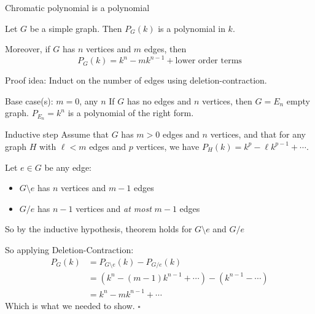 \documentclass{beamer}
\begin{document}
\begin{frame}{Chromatic polynomial is a polynomial}
\begin{theorem}
Let $G$ be a simple graph. Then $P_G(k)$ is a polynomial in $k$.  

Moreover, if $G$ has $n$ vertices and $m$ edges, then 
$$P_G(k)=k^n-mk^{n-1}+\text{lower order terms}$$
\end{theorem}

\begin{block}{Proof idea:}
Induct on the number of edges using deletion-contraction.
\end{block}
\begin{block}{Base case(s): $m=0$, any $n$}
If $G$ has no edges and $n$ vertices, then $G=E_n$ empty graph.
$P_{E_n}=k^n$ is a polynomial of the right form.
\end{block}

\end{frame}
\begin{frame}{Inductive step}
Assume that $G$ has $m>0$ edges and $n$ vertices, and that for any graph $H$ with $\ell<m$ edges and $p$ vertices, we have $P_H(k)=k^p-\ell k^{p-1}+\cdots$.

\begin{block}{Let $e\in G$ be any edge:}
\begin{itemize}
    \item $G\setminus e$ has $n$ vertices and $m-1$ edges
    \item $G/e$ has $n-1$ vertices and \emph{at most} $m-1$ edges
\end{itemize}
So by the inductive hypothesis, theorem holds for $G\setminus e$ and $G/e$
\end{block}
\begin{block}{So applying Deletion-Contraction:}\begin{align*}
    P_G(k) &= P_{G\setminus e}(k)-P_{G/e}(k) \\
    &= \left(k^n-(m-1)k^{n-1} +\cdots\right) -\left(k^{n-1}-\cdots\right) \\
    &= k^n-mk^{n-1}+\cdots
\end{align*}
Which is what we needed to show. \quad$\square$
\end{block}

\end{frame}
\end{document}
